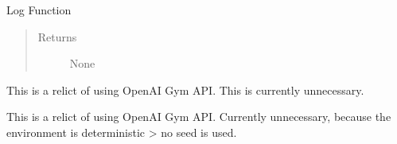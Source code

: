 \documentclass[letterpaper,10pt,english]{sphinxmanual}
\begin{document}
\begin{fulllineitems}

\begin{fulllineitems}
\label{\detokenize{environments:environments.env_tetris_scheduling.Env.log_intermediate_step}}
\sphinxAtStartPar
Log Function
\begin{quote}\begin{description}
\item[{Returns}] \leavevmode
\sphinxAtStartPar
None

\end{description}\end{quote}

\end{fulllineitems}


\begin{fulllineitems}
\label{\detokenize{environments:environments.env_tetris_scheduling.Env.close}}
\sphinxAtStartPar
This is a relict of using OpenAI Gym API. This is currently unnecessary.

\end{fulllineitems}


\begin{fulllineitems}
\label{\detokenize{environments:environments.env_tetris_scheduling.Env.seed}}
\sphinxAtStartPar
This is a relict of using OpenAI Gym API.
Currently unnecessary, because the environment is deterministic \sphinxhyphen{}\textgreater{} no seed is used.

\end{fulllineitems}



\end{fulllineitems}
\end{document}
